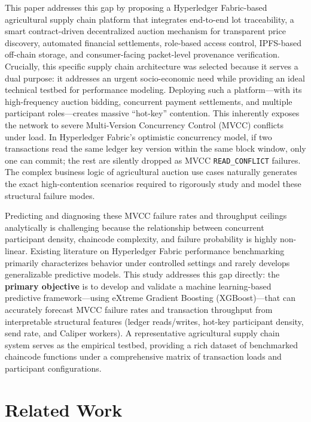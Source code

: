 \documentclass[manuscript,screen]{acmart}
\begin{document}
	This paper addresses this gap by proposing a Hyperledger Fabric-based agricultural supply chain platform that integrates end-to-end lot traceability, a smart contract-driven decentralized auction mechanism for transparent price discovery, automated financial settlements, role-based access control, IPFS-based off-chain storage, and consumer-facing packet-level provenance verification. Crucially, this specific supply chain architecture was selected because it serves a dual purpose: it addresses an urgent socio-economic need while providing an ideal technical testbed for performance modeling. Deploying such a platform---with its high-frequency auction bidding, concurrent payment settlements, and multiple participant roles---creates massive ``hot-key'' contention. This inherently exposes the network to severe Multi-Version Concurrency Control (MVCC) conflicts under load. In Hyperledger Fabric's optimistic concurrency model, if two transactions read the same ledger key version within the same block window, only one can commit; the rest are silently dropped as MVCC \texttt{READ\_CONFLICT} failures. The complex business logic of agricultural auction use cases naturally generates the exact high-contention scenarios required to rigorously study and model these structural failure modes.

	Predicting and diagnosing these MVCC failure rates and throughput ceilings analytically is challenging because the relationship between concurrent participant density, chaincode complexity, and failure probability is highly non-linear. Existing literature on Hyperledger Fabric performance benchmarking primarily characterizes behavior under controlled settings and rarely develops generalizable predictive models. This study addresses this gap directly: the \textbf{primary objective} is to develop and validate a machine learning-based predictive framework---using eXtreme Gradient Boosting (XGBoost)---that can accurately forecast MVCC failure rates and transaction throughput from interpretable structural features (ledger reads/writes, hot-key participant density, send rate, and Caliper workers). A representative agricultural supply chain system serves as the empirical testbed, providing a rich dataset of benchmarked chaincode functions under a comprehensive matrix of transaction loads and participant configurations.
	
	
\section{Related Work}
\end{document}
